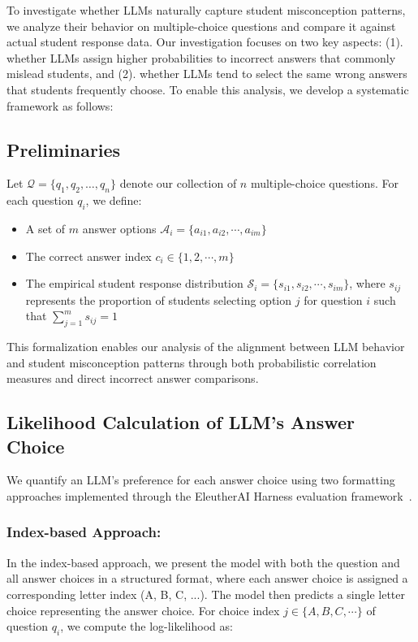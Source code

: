 To investigate whether LLMs naturally capture student misconception patterns, we analyze their behavior on multiple-choice questions and compare it against actual student response data. Our investigation focuses on two key aspects: (1). whether LLMs assign higher probabilities to incorrect answers that commonly mislead students, and (2). whether LLMs tend to select the same wrong answers that students frequently choose. To enable this analysis, we develop a systematic framework as follows:


\subsection{Preliminaries}

Let $\mathcal{Q} = \{q_1, q_2, \ldots, q_n\}$ denote our collection of $n$ multiple-choice questions. For each question $q_i$, we define:

\begin{itemize}
    \item A set of $m$ answer options $\mathcal{A}_i = \{a_{i1}, a_{i2}, \cdots, a_{im}\}$
    \item The correct answer index $c_i \in \{1, 2, \cdots, m\}$
    \item The empirical student response distribution $\mathcal{S}_i = \{s_{i1}, s_{i2}, \cdots , s_{im}\}$, where $s_{ij}$ represents the proportion of students selecting option $j$ for question $i$ such that $\sum_{j=1}^m s_{ij} = 1$
\end{itemize}

This formalization enables our analysis of the alignment between LLM behavior and student misconception patterns through both probabilistic correlation measures and direct incorrect answer comparisons.

\subsection{Likelihood Calculation of LLM's Answer Choice}

We quantify an LLM's preference for each answer choice using two formatting approaches implemented through the EleutherAI Harness evaluation framework~\cite{eval-harness}.


\subsubsection{Index-based Approach:}
In the index-based approach, we present the model with both the question and all answer choices in a structured format, where each answer choice is assigned a corresponding letter index (A, B, C, ...). The model then predicts a single letter choice representing the answer choice. For choice index $j \in \{A, B, C, \cdots\}$ of question $q_i$, we compute the log-likelihood as:


